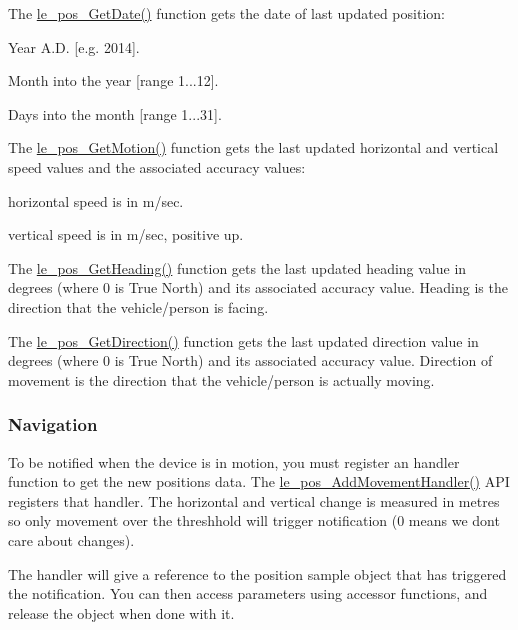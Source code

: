 The {\ttfamily \hyperlink{le__pos__interface_8h_a190d242995bb06518b5a064df5578c85}{le\+\_\+pos\+\_\+\+Get\+Date()}} function gets the date of last updated position\+:
\begin{DoxyItemize}
\item Year A.\+D. \mbox{[}e.\+g. 2014\mbox{]}.
\item Month into the year \mbox{[}range 1...12\mbox{]}.
\item Days into the month \mbox{[}range 1...31\mbox{]}.
\end{DoxyItemize}

The {\ttfamily \hyperlink{le__pos__interface_8h_a5b483fdcd812f4da7bdda284e9bb18b6}{le\+\_\+pos\+\_\+\+Get\+Motion()}} function gets the last updated horizontal and vertical speed values and the associated accuracy values\+:
\begin{DoxyItemize}
\item horizontal speed is in m/sec.
\item vertical speed is in m/sec, positive up.
\end{DoxyItemize}

The {\ttfamily \hyperlink{le__pos__interface_8h_ae06eaad71c152ade96d9b3f2e87a2053}{le\+\_\+pos\+\_\+\+Get\+Heading()}} function gets the last updated heading value in degrees (where 0 is True North) and its associated accuracy value. Heading is the direction that the vehicle/person is facing.

The {\ttfamily \hyperlink{le__pos__interface_8h_a2b5b4e4ce66c4f1653d6f0982bbd5feb}{le\+\_\+pos\+\_\+\+Get\+Direction()}} function gets the last updated direction value in degrees (where 0 is True North) and its associated accuracy value. Direction of movement is the direction that the vehicle/person is actually moving.\hypertarget{c_pos_le_pos_navigation}{}\subsubsection{Navigation}\label{c_pos_le_pos_navigation}
To be notified when the device is in motion, you must register an handler function to get the new position\textquotesingle{}s data. The {\ttfamily \hyperlink{le__pos__interface_8h_a17e99072772110c1609c53247d663ed3}{le\+\_\+pos\+\_\+\+Add\+Movement\+Handler()}} A\+P\+I registers that handler. The horizontal and vertical change is measured in metres so only movement over the threshhold will trigger notification (0 means we don\textquotesingle{}t care about changes).

The handler will give a reference to the position sample object that has triggered the notification. You can then access parameters using accessor functions, and release the object when done with it.

